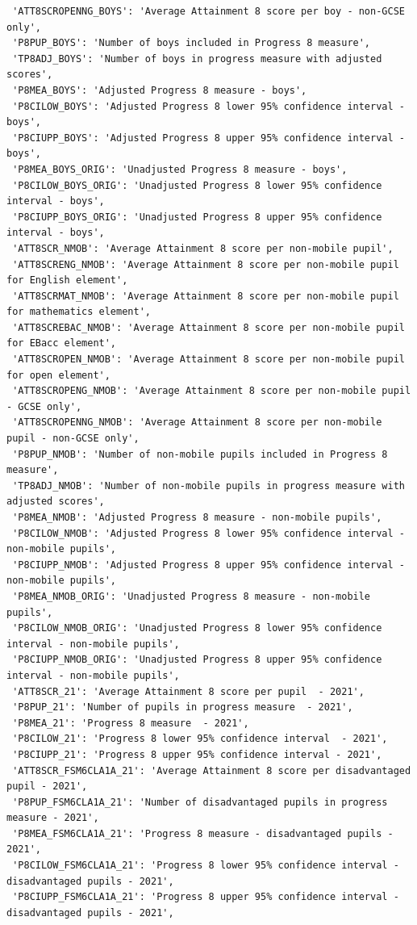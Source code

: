 \documentclass[
  letterpaper,
  DIV=11,
  numbers=noendperiod]{scrartcl}
\begin{document}
\begin{verbatim}
 'ATT8SCROPENNG_BOYS': 'Average Attainment 8 score per boy - non-GCSE only',
 'P8PUP_BOYS': 'Number of boys included in Progress 8 measure',
 'TP8ADJ_BOYS': 'Number of boys in progress measure with adjusted scores',
 'P8MEA_BOYS': 'Adjusted Progress 8 measure - boys',
 'P8CILOW_BOYS': 'Adjusted Progress 8 lower 95% confidence interval - boys',
 'P8CIUPP_BOYS': 'Adjusted Progress 8 upper 95% confidence interval - boys',
 'P8MEA_BOYS_ORIG': 'Unadjusted Progress 8 measure - boys',
 'P8CILOW_BOYS_ORIG': 'Unadjusted Progress 8 lower 95% confidence interval - boys',
 'P8CIUPP_BOYS_ORIG': 'Unadjusted Progress 8 upper 95% confidence interval - boys',
 'ATT8SCR_NMOB': 'Average Attainment 8 score per non-mobile pupil',
 'ATT8SCRENG_NMOB': 'Average Attainment 8 score per non-mobile pupil for English element',
 'ATT8SCRMAT_NMOB': 'Average Attainment 8 score per non-mobile pupil for mathematics element',
 'ATT8SCREBAC_NMOB': 'Average Attainment 8 score per non-mobile pupil for EBacc element',
 'ATT8SCROPEN_NMOB': 'Average Attainment 8 score per non-mobile pupil for open element',
 'ATT8SCROPENG_NMOB': 'Average Attainment 8 score per non-mobile pupil - GCSE only',
 'ATT8SCROPENNG_NMOB': 'Average Attainment 8 score per non-mobile pupil - non-GCSE only',
 'P8PUP_NMOB': 'Number of non-mobile pupils included in Progress 8 measure',
 'TP8ADJ_NMOB': 'Number of non-mobile pupils in progress measure with adjusted scores',
 'P8MEA_NMOB': 'Adjusted Progress 8 measure - non-mobile pupils',
 'P8CILOW_NMOB': 'Adjusted Progress 8 lower 95% confidence interval - non-mobile pupils',
 'P8CIUPP_NMOB': 'Adjusted Progress 8 upper 95% confidence interval - non-mobile pupils',
 'P8MEA_NMOB_ORIG': 'Unadjusted Progress 8 measure - non-mobile pupils',
 'P8CILOW_NMOB_ORIG': 'Unadjusted Progress 8 lower 95% confidence interval - non-mobile pupils',
 'P8CIUPP_NMOB_ORIG': 'Unadjusted Progress 8 upper 95% confidence interval - non-mobile pupils',
 'ATT8SCR_21': 'Average Attainment 8 score per pupil  - 2021',
 'P8PUP_21': 'Number of pupils in progress measure  - 2021',
 'P8MEA_21': 'Progress 8 measure  - 2021',
 'P8CILOW_21': 'Progress 8 lower 95% confidence interval  - 2021',
 'P8CIUPP_21': 'Progress 8 upper 95% confidence interval - 2021',
 'ATT8SCR_FSM6CLA1A_21': 'Average Attainment 8 score per disadvantaged pupil - 2021',
 'P8PUP_FSM6CLA1A_21': 'Number of disadvantaged pupils in progress measure - 2021',
 'P8MEA_FSM6CLA1A_21': 'Progress 8 measure - disadvantaged pupils - 2021',
 'P8CILOW_FSM6CLA1A_21': 'Progress 8 lower 95% confidence interval - disadvantaged pupils - 2021',
 'P8CIUPP_FSM6CLA1A_21': 'Progress 8 upper 95% confidence interval - disadvantaged pupils - 2021',

\end{verbatim}
\end{document}
